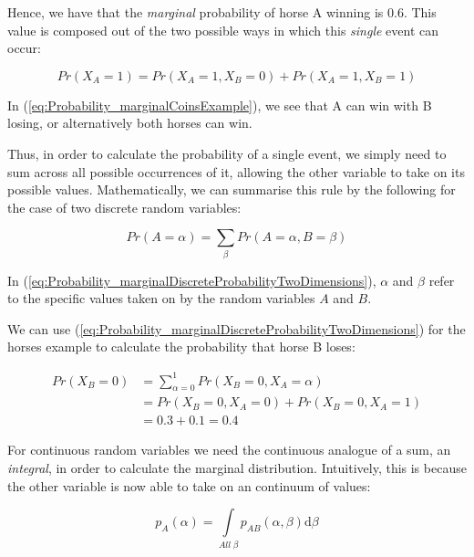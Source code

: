 \documentclass[11pt,fullpage]{book}
\begin{document}
Hence, we have that the \textit{marginal} probability of horse A winning is 0.6. This value is composed out of the two possible ways in which this \textit{single} event can occur:

\begin{equation}\label{eq:Probability_marginalCoinsExample}
Pr(X_A=1) = Pr(X_A=1,X_B=0) + Pr(X_A=1,X_B=1)
\end{equation}

In (\ref{eq:Probability_marginalCoinsExample}), we see that A can win with B losing, or alternatively both horses can win.

Thus, in order to calculate the probability of a single event, we simply need to sum across all possible occurrences of it, allowing the other variable to take on its possible values. Mathematically, we can summarise this rule by the following for the case of two discrete random variables:

\begin{equation}\label{eq:Probability_marginalDiscreteProbabilityTwoDimensions}
Pr(A=\alpha) = \sum\limits_{\beta} Pr(A=\alpha,B=\beta)
\end{equation}

In (\ref{eq:Probability_marginalDiscreteProbabilityTwoDimensions}), $\alpha$ and $\beta$ refer to the specific values taken on by the random variables $A$ and $B$. 

We can use (\ref{eq:Probability_marginalDiscreteProbabilityTwoDimensions}) for the horses example to calculate the probability that horse B loses:

\begin{equation}
\begin{align}
Pr(X_B=0) &= \sum\limits_{\alpha=0}^{1} Pr(X_B=0,X_A=\alpha)\\
&= Pr(X_B=0,X_A=0) + Pr(X_B=0,X_A=1)\\
&= 0.3 + 0.1 = 0.4
\end{align}
\end{equation}

For continuous random variables we need the continuous analogue of a sum, an \textit{integral}, in order to calculate the marginal distribution. Intuitively, this is because the other variable is now able to take on an continuum of values:

\begin{equation}\label{eq:Probability_marginalContinuousProbabilityTwoDimensions}
p_A(\alpha) = \int\limits_{All\;\beta} p_{AB}(\alpha,\beta) \mathrm{d}\beta
\end{equation}
\end{document}
